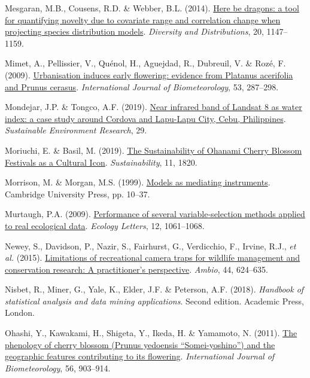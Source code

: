 \documentclass[
  letterpaper,
]{scrbook}
\newlength{\cslhangindent}
\newenvironment{CSLReferences}[2] %
 {\begin{list}{}{%
  \setlength{\itemindent}{0pt}
  \setlength{\leftmargin}{0pt}
  \setlength{\parsep}{0pt}
  \ifodd #1
   \setlength{\leftmargin}{\cslhangindent}
   \setlength{\itemindent}{-1\cslhangindent}
  \fi
  \setlength{\itemsep}{#2\baselineskip}}}
 {\end{list}}
\begin{document}
\begin{CSLReferences}{1}{0}
Mesgaran, M.B., Cousens, R.D. \& Webber, B.L. (2014).
\href{https://doi.org/10.1111/ddi.12209}{Here be dragons: a tool for
quantifying novelty due to covariate range and correlation change when
projecting species distribution models}. \emph{Diversity and
Distributions}, 20, 1147--1159.

Mimet, A., Pellissier, V., Quénol, H., Aguejdad, R., Dubreuil, V. \&
Rozé, F. (2009).
\href{https://doi.org/10.1007/s00484-009-0214-7}{Urbanisation induces
early flowering: evidence from Platanus acerifolia and Prunus cerasus}.
\emph{International Journal of Biometeorology}, 53, 287--298.

Mondejar, J.P. \& Tongco, A.F. (2019).
\href{https://doi.org/10.1186/s42834-019-0016-5}{Near infrared band of
Landsat 8 as water index: a case study around Cordova and Lapu-Lapu
City, Cebu, Philippines}. \emph{Sustainable Environment Research}, 29.

Moriuchi, E. \& Basil, M. (2019).
\href{https://doi.org/10.3390/su11061820}{The Sustainability of Ohanami
Cherry Blossom Festivals as a Cultural Icon}. \emph{Sustainability}, 11,
1820.

Morrison, M. \& Morgan, M.S. (1999).
\href{https://doi.org/10.1017/cbo9780511660108.003}{Models as mediating
instruments}. Cambridge University Press, pp. 10--37.

Murtaugh, P.A. (2009).
\href{https://doi.org/10.1111/j.1461-0248.2009.01361.x}{Performance of
several variable{-}selection methods applied to real ecological data}.
\emph{Ecology Letters}, 12, 1061--1068.

Newey, S., Davidson, P., Nazir, S., Fairhurst, G., Verdicchio, F.,
Irvine, R.J., \emph{et al.} (2015).
\href{https://doi.org/10.1007/s13280-015-0713-1}{Limitations of
recreational camera traps for wildlife management and conservation
research: A practitioner{'}s perspective}. \emph{Ambio}, 44, 624--635.

Nisbet, R., Miner, G., Yale, K., Elder, J.F. \& Peterson, A.F. (2018).
\emph{Handbook of statistical analysis and data mining applications}.
Second edition. Academic Press, London.

Ohashi, Y., Kawakami, H., Shigeta, Y., Ikeda, H. \& Yamamoto, N. (2011).
\href{https://doi.org/10.1007/s00484-011-0496-4}{The phenology of cherry
blossom (Prunus yedoensis {``}Somei-yoshino{''}) and the geographic
features contributing to its flowering}. \emph{International Journal of
Biometeorology}, 56, 903--914.


\end{CSLReferences}
\end{document}
